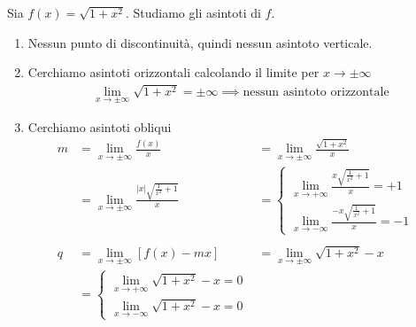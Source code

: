 \documentclass{book}
\begin{document}
\begin{example}
  Sia \(f(x) = \sqrt{1+x^2}\). Studiamo gli asintoti di \(f\).
  \begin{enumerate}
    \item  Nessun punto di discontinuità, quindi nessun asintoto verticale.
    \item  Cerchiamo asintoti orizzontali calcolando il limite per \(x \to \pm \infty\)
          \begin{align*}
            \lim_{x \to \pm\infty} \sqrt{1+x^2} = \pm\infty \implies \text{nessun asintoto orizzontale}
          \end{align*}
    \item Cerchiamo asintoti obliqui
          \begin{align*}
            m & = \lim_{x \to \pm\infty} \frac{f(x)}{x}                                    & =                   \lim_{x \to \pm\infty} \frac{\sqrt{1+x^2}}{x} & \\
              & = \lim_{x \to \pm\infty} \frac{|x|\sqrt{\frac{1}{x^2}+1}}{x}               & =\begin{cases}
                                                                                                \lim_{x \to +\infty} \frac{x\sqrt{\frac{1}{x^2}+1}}{x} = +1 \\
                                                                                                \lim_{x \to -\infty} \frac{-x\sqrt{\frac{1}{x^2}+1}}{x} = -1
                                                                                              \end{cases}   &       \\
            \\
            q & = \lim_{x \to \pm\infty} [f(x) - mx]                                       & = \lim_{x \to \pm\infty} \sqrt{1+x^2} - x                         & \\
              & =                                                            \begin{cases}
                                                                               \lim_{x \to +\infty} \sqrt{1+x^2} - x = 0 \\
                                                                               \lim_{x \to -\infty} \sqrt{1+x^2} - x = 0
                                                                             \end{cases} &                                                                   &   \\

\end{align*}
\end{enumerate}
\end{example}
\end{document}
